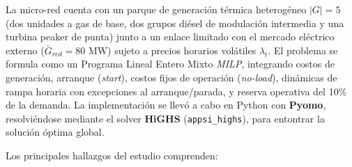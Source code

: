 \documentclass[10pt,letterpaper]{article}
\begin{document}
La micro-red cuenta con un parque de generación térmica heterogéneo $|G| = 5$ (dos unidades a gas de base, dos grupos diésel de modulación intermedia y una turbina peaker de punta) junto a un enlace limitado con el mercado eléctrico externo ($\bar{G}_{red} = 80$ MW) sujeto a precios horarios volátiles $\lambda_t$. El problema se formula como un Programa Lineal Entero Mixto \textit{MILP}, integrando costos de generación, arranque (\textit{start}), costos fijos de operación (\textit{no-load}), dinámicas de rampa horaria con excepciones al arranque/parada, y reserva operativa del 10\% de la demanda. La implementación se llevó a cabo en Python con \textbf{Pyomo}, resolviéndose mediante el solver \textbf{HiGHS} (\texttt{appsi\_highs}), para entontrar la solución óptima global.

Los principales hallazgos del estudio comprenden:
\end{document}
